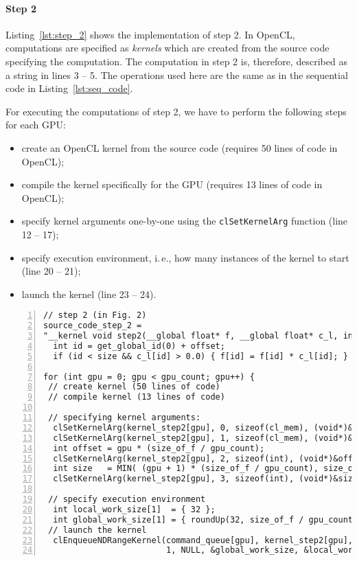\paragraph{Step 2}
Listing~\ref{lst:step_2} shows the implementation of step 2.
In OpenCL, computations are specified as \emph{kernels} which are created from the source code specifying the computation.
The computation in step 2 is, therefore, described as a string in lines 3 -- 5.
The operations used here are the same as in the sequential code in Listing~\ref{lst:seq_code}.

For executing the computations of step 2, we have to perform the following steps for each GPU:
\begin{itemize}
  \item create an OpenCL kernel from the source code (requires 50 lines of code in OpenCL);
  \item compile the kernel specifically for the GPU (requires 13 lines of code in OpenCL);
  \item specify kernel arguments one-by-one using the \texttt{clSetKernelArg} function (line 12 -- 17);
  \item specify execution environment, i.\,e., how many instances of the kernel to start (line 20 -- 21);
  \item launch the kernel (line 23 -- 24).
\end{itemize}
\begin{lstlisting}[caption={Implementation of step 2 in OpenCL (omitting error checks for brevity)},numbers=left,label={lst:step_2}]
// step 2 (in Fig. 2)
source_code_step_2 =
"__kernel void step2(__global float* f, __global float* c_l, int offset, int size) { \
  int id = get_global_id(0) + offset;                                                \
  if (id < size && c_l[id] > 0.0) { f[id] = f[id] * c_l[id]; } }";

for (int gpu = 0; gpu < gpu_count; gpu++) {
 // create kernel (50 lines of code)
 // compile kernel (13 lines of code)

 // specifying kernel arguments:
  clSetKernelArg(kernel_step2[gpu], 0, sizeof(cl_mem), (void*)&f_buffer[gpu]);
  clSetKernelArg(kernel_step2[gpu], 1, sizeof(cl_mem), (void*)&c_l_buffer[gpu]);
  int offset = gpu * (size_of_f / gpu_count);
  clSetKernelArg(kernel_step2[gpu], 2, sizeof(int), (void*)&offset);
  int size   = MIN( (gpu + 1) * (size_of_f / gpu_count), size_of_f );
  clSetKernelArg(kernel_step2[gpu], 3, sizeof(int), (void*)&size);

 // specify execution environment
  int local_work_size[1]  = { 32 };
  int global_work_size[1] = { roundUp(32, size_of_f / gpu_count) };
 // launch the kernel
  clEnqueueNDRangeKernel(command_queue[gpu], kernel_step2[gpu],
                         1, NULL, &global_work_size, &local_work_size, 0, NULL, NULL); }
\end{lstlisting}


